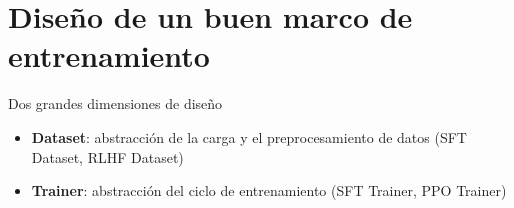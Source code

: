 \section{Diseño de un buen marco de entrenamiento}
\begin{importantbox}{Dos grandes dimensiones de diseño}
\begin{itemize}
  \item \textbf{Dataset}: abstracción de la carga y el preprocesamiento de datos (SFT Dataset, RLHF Dataset)
  \item \textbf{Trainer}: abstracción del ciclo de entrenamiento (SFT Trainer, PPO Trainer)
\end{itemize}
\end{importantbox}

